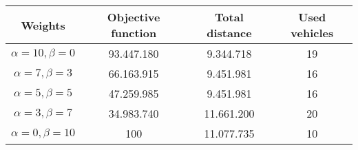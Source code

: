 {
\renewcommand{\arraystretch}{2}
\begin{longtable}[h]{| c | c | c | c |}
    \hline
    \textbf{Weights} & \textbf{Objective function} & \textbf{Total distance} & \textbf{Used vehicles} \\
    \hline
    \endhead
    $\alpha = 10, \beta = 0$ & 93.447.180 &  9.344.718 & 19 \\
    \hline
    $\alpha = 7, \beta = 3$  & 66.163.915 &  9.451.981 & 16 \\
    \hline
    $\alpha = 5, \beta = 5$  & 47.259.985 &  9.451.981 & 16 \\
    \hline
    $\alpha = 3, \beta = 7$  & 34.983.740 & 11.661.200 & 20 \\
    \hline
    $\alpha = 0, \beta = 10$ &        100 & 11.077.735 & 10 \\
    \hline
\end{longtable}
}